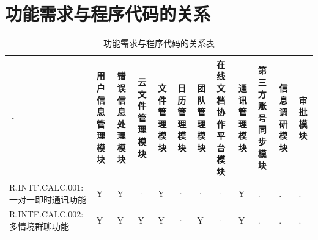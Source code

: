 \section{\color{red}功能需求与程序代码的关系}
    \begin{table}[htbp]
        \centering
        \small
        \caption{\color{red}功能需求与程序代码的关系表} \label{tab:requirement-module}
            \begin{tabular}{|p{9em}|p{2em}|p{2em}|p{2em}|p{2em}|p{2em}|
                            p{2em}|p{2em}|p{2em}|p{2em}|p{2em}|p{2em}|}
            \hline %
            ·   & 用户信息管理模块      & 错误信息处理模块  & 云文件管理模块 
                & 文件管理模块          & 日历管理模块      & 团队管理模块      
                & 在线文档协作平台模块  & 通讯管理模块      & {\color{red}第三方账号同步模块}
                & {\color{red}信息调研模块}                 & {\color{red}审批模块}         \\
            \hline %
            R.INTF.CALC.001: 一对一即时通讯功能
                & Y                     & Y                 & · 
                & Y                     & ·                 & · 
                & ·                     & Y                 & .
                & .                     & . \\
            \hline  %
            R.INTF.CALC.002: 多情境群聊功能
                & Y                     & Y                 & Y
                & Y                     & ·                 & Y 
                & ·                     & Y                 & .
                & .                     & . \\

\end{tabular}
\end{table}
